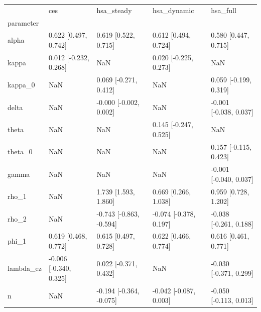 \begin{tabular}{lllll}
\toprule
 & ces & hsa\_steady & hsa\_dynamic & hsa\_full \\
parameter &  &  &  &  \\
\midrule
alpha & 0.622 [0.497, 0.742] & 0.619 [0.522, 0.715] & 0.612 [0.494, 0.724] & 0.580 [0.447, 0.715] \\
kappa & 0.012 [-0.232, 0.268] & NaN & 0.020 [-0.225, 0.273] & NaN \\
kappa\_0 & NaN & 0.069 [-0.271, 0.412] & NaN & 0.059 [-0.199, 0.319] \\
delta & NaN & -0.000 [-0.002, 0.002] & NaN & -0.001 [-0.038, 0.037] \\
theta & NaN & NaN & 0.145 [-0.247, 0.525] & NaN \\
theta\_0 & NaN & NaN & NaN & 0.157 [-0.115, 0.423] \\
gamma & NaN & NaN & NaN & -0.001 [-0.040, 0.037] \\
rho\_1 & NaN & 1.739 [1.593, 1.860] & 0.669 [0.266, 1.038] & 0.959 [0.728, 1.202] \\
rho\_2 & NaN & -0.743 [-0.863, -0.594] & -0.074 [-0.378, 0.197] & -0.038 [-0.261, 0.188] \\
phi\_1 & 0.619 [0.468, 0.772] & 0.615 [0.497, 0.728] & 0.622 [0.466, 0.774] & 0.616 [0.461, 0.771] \\
lambda\_ez & -0.006 [-0.340, 0.325] & 0.022 [-0.371, 0.432] & NaN & -0.030 [-0.371, 0.299] \\
n & NaN & -0.194 [-0.364, -0.075] & -0.042 [-0.087, 0.003] & -0.050 [-0.113, 0.013] \\
\bottomrule
\end{tabular}
